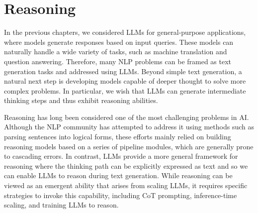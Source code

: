 
%




\chapter{Reasoning}

\thispagestyle{chapterurl} %

In the previous chapters, we considered LLMs for general-purpose applications, where models generate responses based on input queries. These models can naturally handle a wide variety of tasks, such as machine translation and question answering. Therefore, many NLP problems can be framed as text generation tasks and addressed using LLMs. Beyond simple text generation, a natural next step is developing models capable of deeper thought to solve more complex problems. In particular, we wish that LLMs can generate intermediate thinking steps and thus exhibit reasoning abilities.

Reasoning has long been considered one of the most challenging problems in AI. Although the NLP community has attempted to address it using methods such as parsing sentences into logical forms, these efforts mainly relied on building reasoning models based on a series of pipeline modules, which are generally prone to cascading errors. In contrast, LLMs provide a more general framework for reasoning where the thinking path can be explicitly expressed as text and so we can enable LLMs to reason during text generation. While reasoning can be viewed as an emergent ability that arises from scaling LLMs, it requires specific strategies to invoke this capability, including CoT prompting, inference-time scaling, and training LLMs to reason.


